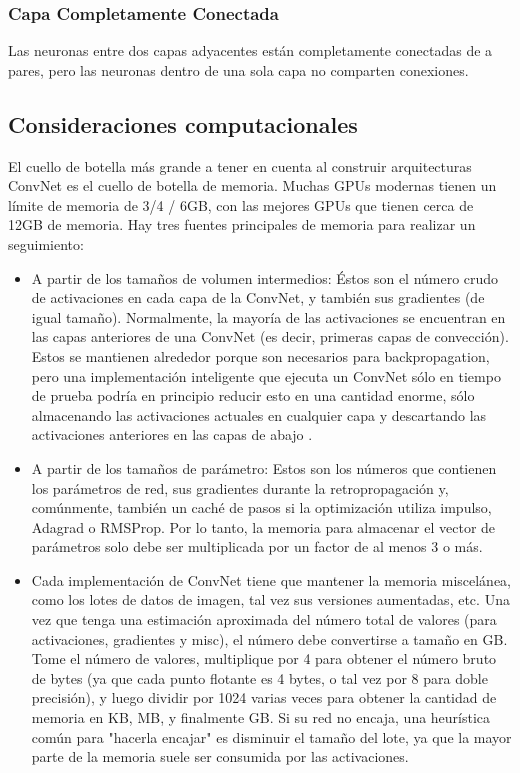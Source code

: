 \documentclass[a4paper,12pt,spanish]{book}
\begin{document}
      \subsubsection{Capa Completamente Conectada} 
	Las neuronas entre dos capas adyacentes están completamente conectadas de a pares, pero las neuronas dentro de una sola capa no comparten conexiones.

    \subsection {Consideraciones computacionales}
      El cuello de botella más grande a tener en cuenta al construir arquitecturas ConvNet es el cuello de botella de memoria. 
      Muchas GPUs modernas tienen un límite de memoria de 3/4 / 6GB, con las mejores GPUs que tienen cerca de 12GB de memoria. 
      Hay tres fuentes principales de memoria para realizar un seguimiento:
      \begin{itemize}
	\item A partir de los tamaños de volumen intermedios: Éstos son el número crudo de activaciones en cada capa de la ConvNet, y también sus gradientes (de igual tamaño). Normalmente, la mayoría de las activaciones se encuentran en las capas anteriores de una ConvNet (es decir, primeras capas de convección). Estos se mantienen alrededor porque son necesarios para backpropagation, pero una implementación inteligente que ejecuta un ConvNet sólo en tiempo de prueba podría en principio reducir esto en una cantidad enorme, sólo almacenando las activaciones actuales en cualquier capa y descartando las activaciones anteriores en las capas de abajo .
	\item A partir de los tamaños de parámetro: Estos son los números que contienen los parámetros de red, sus gradientes durante la retropropagación y, comúnmente, también un caché de pasos si la optimización utiliza impulso, Adagrad o RMSProp. Por lo tanto, la memoria para almacenar el vector de parámetros solo debe ser multiplicada por un factor de al menos 3 o más.
	\item Cada implementación de ConvNet tiene que mantener la memoria miscelánea, como los lotes de datos de imagen, tal vez sus versiones aumentadas, etc.
	Una vez que tenga una estimación aproximada del número total de valores (para activaciones, gradientes y misc), el número debe convertirse a tamaño en GB. Tome el número de valores, multiplique por 4 para obtener el número bruto de bytes (ya que cada punto flotante es 4 bytes, o tal vez por 8 para doble precisión), y luego dividir por 1024 varias veces para obtener la cantidad de memoria en KB, MB, y finalmente GB. Si su red no encaja, una heurística común para "hacerla encajar" es disminuir el tamaño del lote, ya que la mayor parte de la memoria suele ser consumida por las activaciones.
      \end{itemize}
\end{document}
